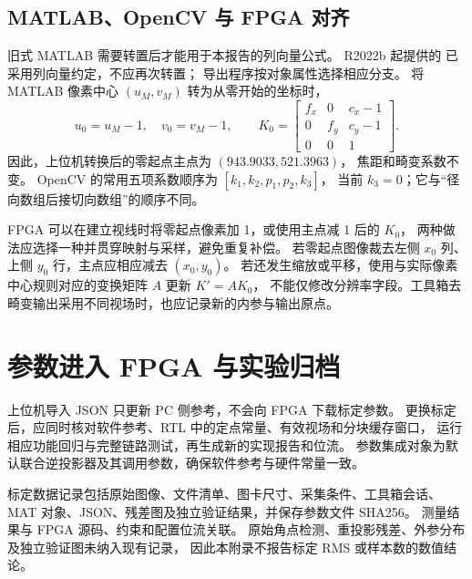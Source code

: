 \subsection{MATLAB、OpenCV 与 FPGA 对齐}
旧式 MATLAB  需要转置后才能用于本报告的列向量公式。
R2022b 起提供的  已采用列向量约定，不应再次转置；
导出程序按对象属性选择相应分支\cite{matlab-camera-parameters}。
将 MATLAB 像素中心 $(u_M,v_M)$ 转为从零开始的坐标时，
\begin{equation}
u_0=u_M-1,\quad v_0=v_M-1,\qquad
K_0=\begin{bmatrix}
f_x&0&c_x-1\\0&f_y&c_y-1\\0&0&1
\end{bmatrix}.
\end{equation}
因此，上位机转换后的零起点主点为 $(943.9033,521.3963)$，
焦距和畸变系数不变。
OpenCV 的常用五项系数顺序为 $[k_1,k_2,p_1,p_2,k_3]$，
当前 $k_3=0$；它与“径向数组后接切向数组”的顺序不同。

FPGA 可以在建立视线时将零起点像素加 1，或使用主点减 1 后的 $K_0$，
两种做法应选择一种并贯穿映射与采样，避免重复补偿。
若零起点图像裁去左侧 $x_0$ 列、上侧 $y_0$ 行，主点应相应减去 $(x_0,y_0)$。
若还发生缩放或平移，使用与实际像素中心规则对应的变换矩阵 $A$ 更新 $K'=AK_0$，
不能仅修改分辨率字段。工具箱去畸变输出采用不同视场时，也应记录新的内参与输出原点。

\section{参数进入 FPGA 与实验归档}
上位机导入 JSON 只更新 PC 侧参考，不会向 FPGA 下载标定参数。
更换标定后，应同时核对软件参考、RTL 中的定点常量、有效视场和分块缓存窗口，
运行相应功能回归与完整链路测试，再生成新的实现报告和位流。
参数集成对象为默认联合逆投影器及其调用参数，确保软件参考与硬件常量一致。

标定数据记录包括原始图像、文件清单、图卡尺寸、采集条件、工具箱会话、
MAT 对象、JSON、残差图及独立验证结果，并保存参数文件 SHA256。
测量结果与 FPGA 源码、约束和配置位流关联。
原始角点检测、重投影残差、外参分布及独立验证图未纳入现有记录，
因此本附录不报告标定 RMS 或样本数的数值结论。
